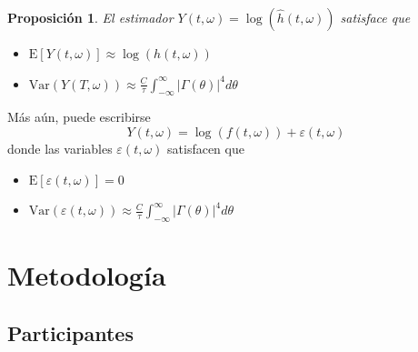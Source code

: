 \documentclass[serif,mathserif,professionalfont]{beamer}
\newtheorem{proposicion}{Proposición}
\newcommand{\intR}{\int_{-\infty}^{\infty}}
\newcommand{\est}[1]{\widehat{ #1 }}
\newcommand{\E}[1]{\mathrm{E}\left[ #1 \right]}
\newcommand{\Var}[1]{\mathrm{Var}\left( #1 \right)}
\newcommand{\abso}[1]{\left| #1 \right|}
\begin{document}

\begin{frame}
\begin{proposicion}
El estimador $ Y(t,\omega) = \log{\left( \est{h}(t,\omega)\right)}$ satisface que
\begin{itemize}
\item $\displaystyle 
\E{ Y(t,\omega) } \approx \log \left( h(t,\omega) \right)$
\item $\displaystyle 
\Var{ Y(T,\omega) } 
\approx \frac{C}{\tau} \intR \abso{\Gamma (\theta)}^{4} d\theta $
\end{itemize}
\end{proposicion}

M\'as a\'un, puede escribirse
\begin{equation*}
Y(t,\omega) = \log \left( f(t,\omega) \right) + \varepsilon(t,\omega)
\end{equation*}
donde las variables $\varepsilon(t,\omega)$ satisfacen que
\begin{itemize}
\item $\displaystyle \E{\varepsilon(t,\omega)} = 0$
\item $\displaystyle \Var{\varepsilon(t,\omega)}
\approx \frac{C}{\tau} \intR \abso{\Gamma (\theta)}^{4} d\theta$
\end{itemize}
\end{frame}



\section{Metodolog\'ia}


\subsection{Participantes}

\end{document}
